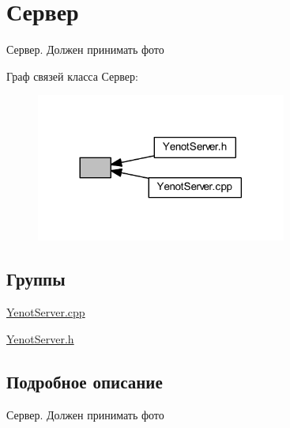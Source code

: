 \hypertarget{group__server}{}\section{Сервер}
\label{group__server}


Сервер. Должен принимать фото  


Граф связей класса Сервер\+:
\nopagebreak
\begin{figure}[H]
\begin{center}
\leavevmode
\includegraphics[width=233pt]{group__server}
\end{center}
\end{figure}
\subsection*{Группы}
\begin{DoxyCompactItemize}
\item 
\mbox{\hyperlink{group__serveryenotservercpp}{Yenot\+Server.\+cpp}}
\item 
\mbox{\hyperlink{group__serveryenotserverh}{Yenot\+Server.\+h}}
\end{DoxyCompactItemize}


\subsection{Подробное описание}
Сервер. Должен принимать фото 

